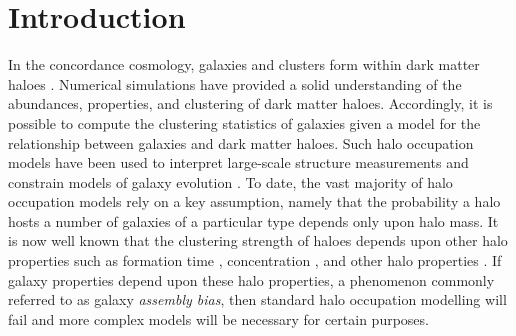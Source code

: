 \documentclass[usenatbib,fleqn]{mnras}
\begin{document}
\section{Introduction}
\label{section:introduction}

In the concordance cosmology, galaxies and clusters form within dark matter haloes \citep{white_rees78,blumenthal_etal84, mo_etal10}. Numerical simulations have provided a solid understanding of the abundances, properties, and clustering of dark matter haloes. Accordingly, it is possible to compute the clustering statistics of galaxies given a model for the relationship between galaxies and dark matter haloes. Such halo occupation models have been used to interpret large-scale structure measurements and constrain models of galaxy evolution \citep{yang_etal03,tinker_etal05,zehavi_etal05b,porciani_norberg06,vdbosch_etal07,zheng_etal07,conroy_wechsler09,yang_etal09b,zehavi_etal11,guo_etal11a,wake_etal11,yang_etal11a,yang_etal12,leauthaud_etal12,rodriguezpuebla_etal12, behroozi_etal13b, moster_etal13, tinker_etal13,cacciato_etal13,more_etal13,guo_etal14,zu_mandelbaum15b}. To date, the vast majority of halo occupation models rely on a key assumption, namely that the probability a halo hosts a number of galaxies of a particular type depends only upon halo mass. It is now well known that the clustering strength of haloes depends upon other halo properties such as formation time \citep{gao_etal05,harker_etal06,wechsler_etal06,gao_white07,croton_etal07,zentner07,dalal_etal08, li_etal08, lacerna_padilla11}, concentration \citep{wechsler_etal06,faltenbacher_white10}, and other halo properties  \citep{bett_etal07, hahn_etal07a, hahn_etal07b, hahn_etal09, faltenbacher_white10, hester_tasitsiomi10, lacerna_padilla12, vandaalen_etal12, fisher_faltenbacher16, sunayama_etal16, chavesmontero_etal16}. If galaxy properties depend upon these halo properties, a phenomenon commonly referred to as galaxy {\em assembly bias}, then standard halo occupation modelling will fail \citep{zentner_etal14} and more complex models \citep{gilmarin_etal11, hearin_etal16} will be necessary for certain purposes.
\end{document}
